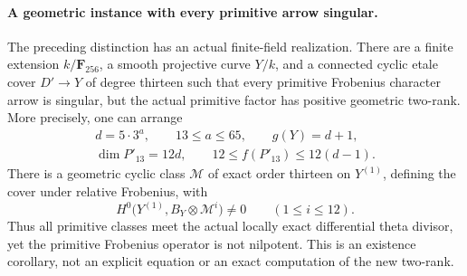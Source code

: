 \paragraph{A geometric instance with every primitive arrow singular.}
The preceding distinction has an actual finite-field realization.
There are a finite extension $k/\mathbf F_{256}$, a smooth
projective curve $Y/k$, and a connected cyclic etale cover
$D'\to Y$ of degree thirteen such that every primitive
Frobenius character arrow is singular, but the actual primitive
factor has positive geometric two-rank. More precisely, one
can arrange
\[
 \begin{gathered}
 d=5\cdot3^a,\qquad 13\le a\le65,\qquad g(Y)=d+1,\\
 \dim P'_{13}=12d,\qquad 12\le f(P'_{13})\le12(d-1).
 \end{gathered}
 \tag{PIA.1}
\]
There is a geometric cyclic class $\mathcal M$ of exact order
thirteen on $Y^{(1)}$, defining the cover under relative
Frobenius, with
\[
 H^0\bigl(Y^{(1)},B_Y\otimes\mathcal M^i\bigr)\ne0
                           \qquad(1\le i\le12).
 \tag{PIA.2}
\]
Thus all primitive classes meet the actual locally exact
differential theta divisor, yet the primitive Frobenius operator
is not nilpotent. This is an existence corollary, not an
explicit equation or an exact computation of the new two-rank.

